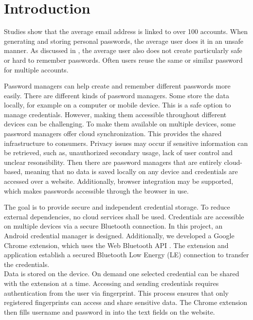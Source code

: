 \section*{Introduction}
\label{introduction}

Studies show that the average email address is linked to over 100 accounts. \cite{DigitalGuardian} 
When generating and storing personal passwords, the average user does it in an unsafe manner. \cite{pilar2012passwords} As discussed in \cite{DBLP:journals/cacm/AdamsS99}, the average user also does not create particularly safe or hard to remember passwords. Often users reuse the same or similar password for multiple accounts. \cite{DBLP:journals/cacm/AdamsS99} \cite{pilar2012passwords} \cite{Statista}

Password managers can help create and remember different passwords more easily. There are different kinds of password managers. Some store the data locally, for example on a computer or mobile device. This is a safe option to manage credentials. However, making them accessible throughout different devices can be challenging. To make them available on multiple devices, some password managers offer cloud synchronization. 
This provides the shared infrastructure to consumers. Privacy issues may occur if sensitive information can be retrieved, such as, unauthorized secondary usage, lack of user control and unclear resonsibility. \cite{DBLP:journals/corr/SainiM14} Then there are password managers that are entirely cloud-based, meaning that no data is saved locally on any device and credentials are accessed over a website. Additionally, browser integration may be supported, which makes passwords accessible through the browser in use.

The goal is to provide secure and independent credential storage. To reduce external dependencies, no cloud services shall be used. Credentials are accessible on multiple devices via a secure Bluetooth connection. In this project, an Android credential manager is designed.  Additionally, we developed a Google Chrome extension, which uses the Web Bluetooth API \cite{WebBTAPI}. The extension and application establish a secured Bluetooth Low Energy (LE) connection to transfer the credentials. \\
Data is stored on the device. On demand one selected credential can be shared with the extension at a time. Accessing and sending credentials requires authentication from the user via fingerprint. This process ensures that only registered fingerprints can access and share sensitive data. 
The Chrome extension then fills username and password in into the text fields on the website. \\

